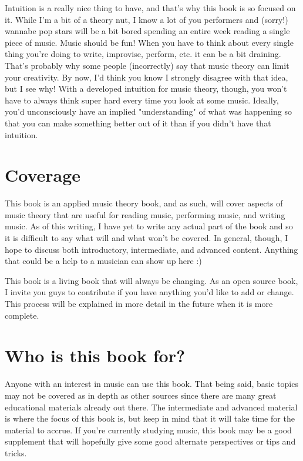 \documentclass[../OpenAppliedMusicTheory.tex]{subfiles}
\begin{document}
    Intuition is a really nice thing to have, and that's why this book is so focused on it. While I'm a bit of a theory nut, I know a lot of you performers and (sorry!) wannabe pop stars will be a bit bored spending an entire week reading a single piece of music. Music should be fun! When you have to think about every single thing you're doing to write, improvise, perform, etc. it can be a bit draining. That's probably why some people (incorrectly) say that music theory can limit your creativity. By now, I'd think you know I strongly disagree with that idea, but I see why! With a developed intuition for music theory, though, you won't have to always think super hard every time you look at some music. Ideally, you'd unconsciously have an implied "understanding" of what was happening so that you can make something better out of it than if you didn't have that intuition.

    \section*{Coverage}
    This book is an applied music theory book, and as such, will cover aspects of music theory that are useful for reading music, performing music, and writing music. As of this writing, I have yet to write any actual part of the book and so it is difficult to say what will and what won't be covered. In general, though, I hope to discuss both introductory, intermediate, and advanced content. Anything that could be a help to a musician can show up here :)

    This book is a living book that will always be changing. As an open source book, I invite you guys to contribute if you have anything you'd like to add or change. This process will be explained in more detail in the future when it is more complete.  

    \section*{Who is this book for?}
    Anyone with an interest in music can use this book. That being said, basic topics may not be covered as in depth as other sources since there are many great educational materials already out there. The intermediate and advanced material is where the focus of this book is, but keep in mind that it will take time for the material to accrue. If you're currently studying music, this book may be a good supplement that will hopefully give some good alternate perspectives or tips and tricks.
\end{document}
